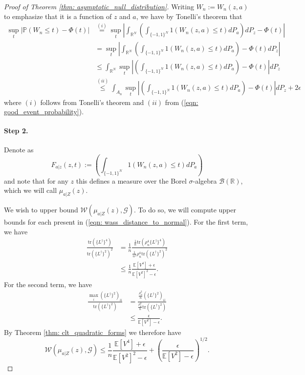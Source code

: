 \documentclass{article}
\newcommand{\Reals}{\mathbb{R}}
\newcommand{\Expect}[1]{\mathbb{E}\left[ #1 \right]}
\newcommand{\Prob}[1]{\mathbb{P}\left( #1 \right)}
\newcommand{\abs}[1]{\left \lvert #1 \right \rvert}
\newcommand{\Linv}{L^{\dagger}}
\newcommand{\tr}{\text{tr}}
\theoremstyle{alden}
\theoremstyle{definition}
\theoremstyle{remark}
\begin{document}
\begin{proof}[Proof of Theorem \ref{thm: asymptotic_null_distribution}]
	
	Writing $W_n := W_n(z,a)$ to emphasize that it is a function of $z$ and $a$, we have by Tonelli's theorem that
	\begin{align}
	\label{eqn: conditional_ks_distance}
	\sup_{t} \abs{\Prob{W_n \leq t} - \Phi(t)} & \overset{(i)}{=} \sup_{t} \abs{ \int_{\Reals^N} \left( \int_{\{-1,1\}^N} 1(W_n(z,a) \leq t) dP_a\right) dP_z - \Phi(t) } \nonumber \\
	& = \sup_{t} \abs{ \int_{\Reals^N} \left( \int_{\{-1,1\}^N} 1(W_n(z,a) \leq t) dP_a\right) - \Phi(t)dP_z } \nonumber \\
	& \leq \int_{\Reals^N} \sup_{t} \abs{\left( \int_{\{-1,1\}^N} 1(W_n(z,a) \leq t)   dP_a\right) - \Phi(t) } dP_z \nonumber \\
	& \overset{(ii)}{\leq} \int_{A_n} \sup_{t} \abs{\left( \int_{\{-1,1\}^N} 1(W_n(z,a) \leq t) dP_a\right) - \Phi(t)} dP_z + 2 \epsilon
	\end{align}
	where $(i)$ follows from Tonelli's theorem and $(ii)$ from (\ref{eqn: good_event_probability}).
	
	\paragraph{Step 2.}
	
	Denote as
	\begin{equation*}
	F_{a|z}(z, t) := \left( \int_{\{-1,1\}^N} 1(W_n(z,a) \leq t) dP_a\right)
	\end{equation*}
	and note that for any $z$ this defines a measure over the Borel $\sigma$-algebra $\mathcal{B}(\Reals)$, which we will call $\mu_{a|Z}(z)$.
	
	We wish to upper bound $\mathcal{W}(\mu_{a|Z}(z), \mathcal{G})$. To do so, we will compute upper bounds for each present in (\ref{eqn: wass_distance_to_normal}). For the first term, we have
	\begin{align*}
	\frac{\tr(\{\Linv \}^4)}{\tr(\{ \Linv \}^2)^2} & = \frac{1}{n} \frac{\frac{1}{n} \tr(\rho_n^4 \{\Linv \}^4)}{ \frac{1}{n^2} \rho_n^4 \tr(\{ \Linv \}^2)^2} \\
	& \leq \frac{1}{n} \frac{\Expect{V^4} + \epsilon}{\Expect{V^2}^2 - \epsilon}.
	\end{align*}
	For the second term, we have
	\begin{align*}
	\frac{ \underset{i}{\max}(\{\Linv\}^2)_{ii} }{ \tr(\{\Linv\}^2) } & = \frac{ \frac{\rho_n^2}{n} (\{\Linv\}^2)_{ii}}{ \frac{\rho_n^2}{n} \tr(\{\Linv\}^2) } \\
	& \leq \frac{ \epsilon }{ \Expect{V^2} - \epsilon }.
	\end{align*}
	By Theorem \ref{thm: clt_quadratic_forms} we therefore have
	\begin{equation}
	\label{eqn: wasserstein_conditional_bound}
	\mathcal{W}(\mu_{a|Z}(z), \mathcal{G} ) \leq \frac{1}{n} \frac{\Expect{V^4} + \epsilon}{\Expect{V^2}^2 - \epsilon} + \left(\frac{ \epsilon }{ \Expect{V^2} - \epsilon } \right)^{1/2}.
	\end{equation}
	

\end{proof}
\end{document}
